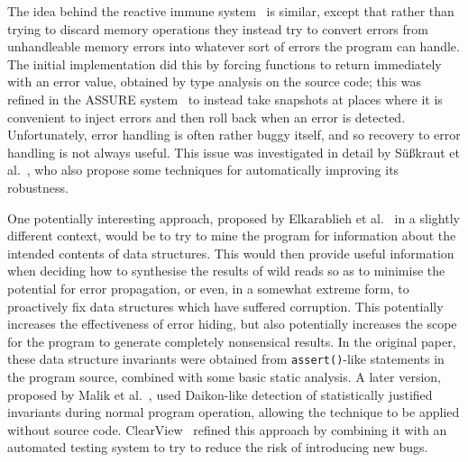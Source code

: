 The idea behind the reactive immune system~\cite{Sidiroglou2005} is
similar, except that rather than trying to discard memory operations
they instead try to convert errors from unhandleable memory errors
into whatever sort of errors the program can handle.  The initial
implementation did this by forcing functions to return immediately
with an error value, obtained by type analysis on the source code;
this was refined in the ASSURE system~\cite{Sidiroglou2009} to instead
take snapshots at places where it is convenient to inject errors and
then roll back when an error is detected.  Unfortunately, error
handling is often rather buggy itself, and so recovery to error
handling is not always useful.  This issue was investigated in detail
by S\"{u}\ss{}kraut et al.~\cite{FFFSusskraut2006}, who also propose
some techniques for automatically improving its robustness.

One potentially interesting approach, proposed by Elkarablieh et
al.~\cite{Elkarablieh2007} in a slightly different context, would be
to try to mine the program for information about the intended contents
of data structures.  This would then provide useful information when
deciding how to synthesise the results of wild reads so as to minimise
the potential for error propagation, or even, in a somewhat extreme
form, to proactively fix data structures which have suffered
corruption.  This potentially increases the effectiveness of error
hiding, but also potentially increases the scope for the program to
generate completely nonsensical results.  In the original paper, these
data structure invariants were obtained from \verb|assert()|-like
statements in the program source, combined with some basic static
analysis.  A later version, proposed by Malik et al.~\cite{Malik},
used Daikon-like detection of statistically justified invariants
during normal program operation, allowing the technique to be applied
without source code.  ClearView~\cite{Perkins} refined this approach
by combining it with an automated testing system to try to reduce the
risk of introducing new bugs.

